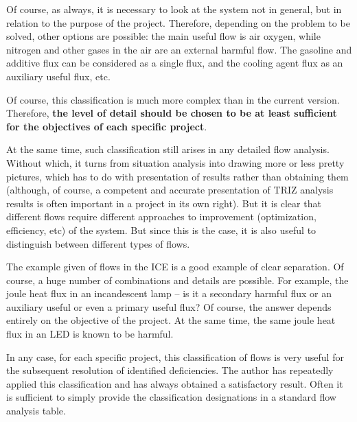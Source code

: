 \documentclass[a4paper,11pt]{article}
\begin{document}
Of course, as always, it is necessary to look at the system not in general,
but in relation to the purpose of the project. Therefore, depending on the
problem to be solved, other options are possible: the main useful flow is air
oxygen, while nitrogen and other gases in the air are an external harmful
flow. The gasoline and additive flux can be considered as a single flux, and
the cooling agent flux as an auxiliary useful flux, etc.

Of course, this classification is much more complex than in the current
version.  Therefore, \textbf{the level of detail should be chosen to be at
  least sufficient for the objectives of each specific project}.

At the same time, such classification still arises in any detailed flow
analysis. Without which, it turns from situation analysis into drawing more or
less pretty pictures, which has to do with presentation of results rather than
obtaining them (although, of course, a competent and accurate presentation of
TRIZ analysis results is often important in a project in its own right). But
it is clear that different flows require different approaches to improvement
(optimization, efficiency, etc) of the system. But since this is the case, it
is also useful to distinguish between different types of flows.

The example given of flows in the ICE is a good example of clear separation.
Of course, a huge number of combinations and details are possible. For
example, the joule heat flux in an incandescent lamp -- is it a secondary
harmful flux or an auxiliary useful or even a primary useful flux?  Of course,
the answer depends entirely on the objective of the project. At the same time,
the same joule heat flux in an LED is known to be harmful.

In any case, for each specific project, this classification of flows is very
useful for the subsequent resolution of identified deficiencies. The author
has repeatedly applied this classification and has always obtained a
satisfactory result. Often it is sufficient to simply provide the
classification designations in a standard flow analysis table.
\end{document}
